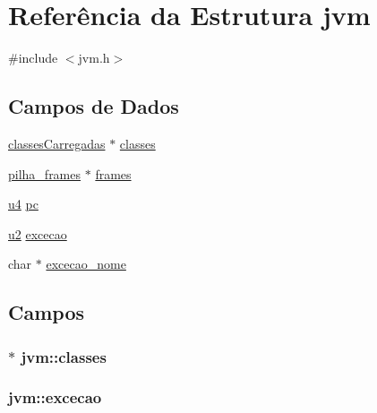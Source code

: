 \hypertarget{structjvm}{}\section{Referência da Estrutura jvm}
\label{structjvm}


{\ttfamily \#include $<$jvm.\+h$>$}

\subsection*{Campos de Dados}
\begin{DoxyCompactItemize}
\item 
\hyperlink{structclassesCarregadas}{classes\+Carregadas} $\ast$ \hyperlink{structjvm_a43783d4b1817816cccc62a08154190f6}{classes}
\item 
\hyperlink{structpilha__frames}{pilha\+\_\+frames} $\ast$ \hyperlink{structjvm_a4277814c8cb94f0e77f09428d3d668b9}{frames}
\item 
\hyperlink{lista__operandos_8h_ae5be1f726785414dd1b77d60df074c9d}{u4} \hyperlink{structjvm_ac879eb42576afb2256646f478a7f68c2}{pc}
\item 
\hyperlink{lista__operandos_8h_a732cde1300aafb73b0ea6c2558a7a54f}{u2} \hyperlink{structjvm_a9a1827338d5d118644ec0a72a76a5d89}{excecao}
\item 
char $\ast$ \hyperlink{structjvm_a471ac752db9424623227c661b194399b}{excecao\+\_\+nome}
\end{DoxyCompactItemize}


\subsection{Campos}
\subsubsection[{\texorpdfstring{classes}{classes}}]{$\ast$ jvm\+::classes}\hypertarget{structjvm_a43783d4b1817816cccc62a08154190f6}{}\label{structjvm_a43783d4b1817816cccc62a08154190f6}
\subsubsection[{\texorpdfstring{excecao}{excecao}}]{ jvm\+::excecao}\hypertarget{structjvm_a9a1827338d5d118644ec0a72a76a5d89}{}\label{structjvm_a9a1827338d5d118644ec0a72a76a5d89}
